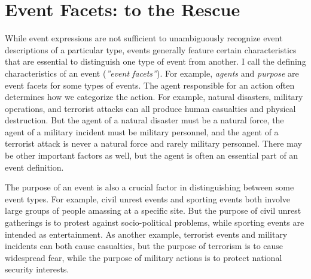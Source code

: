 \section{Event Facets: to the Rescue}
\label{facets}
While event expressions are not sufficient to unambiguously recognize event descriptions 
of a particular type, events generally feature certain characteristics that  
are essential to distinguish one type
of event from another. I call the defining characteristics of an event 
({\it ''event facets''}).
For example, {\it agents} and {\it purpose} are 
event facets for some types of events.  
The agent 
responsible for an action often determines how we categorize the action. 
For example, natural disasters, military operations, and terrorist
attacks can all produce human casualties and physical destruction. 
But the agent of a natural disaster must be a natural
force, the agent of a military incident must be military
personnel, and the agent of a terrorist attack is never a natural
force and rarely military personnel. 
There may be other important factors as well, but the agent is 
often an essential part of an event definition. 


The purpose of an event is also a crucial factor in
distinguishing between some event types. 
For example, civil unrest events and sporting events both involve
large groups of people amassing at a specific site. 
But the purpose of
civil unrest gatherings
is to protest against socio-political problems, while
sporting events are intended as entertainment. 
As another example, terrorist events and military incidents can both cause
casualties, but the purpose of terrorism is to cause
widespread fear, while the purpose of military actions is
to protect  national security interests. 



